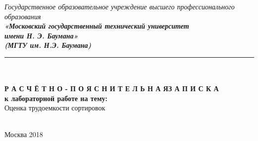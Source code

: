 


\begin{center}
	\hfill \break
	\textit{
		\normalsize{Государственное образовательное учреждение высшего профессионального образования}}\\ 
	
	\textit{
		\normalsize  {\bf  «Московский государственный технический университет}\\ 
		\normalsize  {\bf имени Н. Э. Баумана»}\\
		\normalsize  {\bf (МГТУ им. Н.Э. Баумана)}\\
	}
	\noindent\rule{\textwidth}{2pt}
	\hfill \break
	\noindent
	\\
	\noindent
	\\
	\hfill\break
	\hfill \break
	\hfill \break
	\hfill \break
	\normalsize{\bf Р А С Ч Ё Т Н О - П О Я С Н И Т Е Л Ь Н А Я\space\space З А П И С К А}\\
	\normalsize{\bf к лабораторной работе на тему:}\\
	\hfill \break
	\large{ Оценка трудоемкости сортировок}\\
	\hfill \break
	\hfill \break
	\hfill \break
	\hfill \break
	\hfill \break	
	\normalsize {
		\noindent
		\makebox[\textwidth][c]{}%
	}\\
	\hfill \break	
	\normalsize {
		\noindent
		\makebox[\textwidth][c]{ ~~~~~~~~      }%
	}
	\hfill \break
	\hfill \break
	\hfill \break
	\hfill \break
\end{center}
\hfill \break
\hfill \break
\begin{center} Москва 2018\end{center}

\thispagestyle{empty} %


